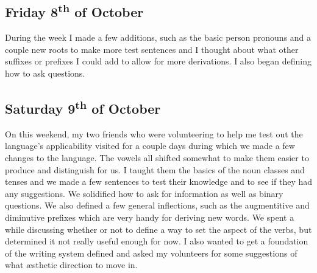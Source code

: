 \documentclass[a4paper,10pt]{article}
\begin{document}
\subsection{Friday 8\textsuperscript{th} of October}
During the week I made a few additions, such as the basic person pronouns and a couple new
roots to make more test sentences and I thought about what other suffixes or prefixes I
could add to allow for more derivations. I also began defining how to ask questions.

\subsection{Saturday 9\textsuperscript{th} of October}
On this weekend, my two friends who were volunteering to help me test out the language's
applicability visited for a couple days during which we made a few changes to the language.
The vowels all shifted somewhat to make them easier to produce and distinguish for us. I
taught them the basics of the noun classes and tenses and we made a few sentences to test
their knowledge and to see if they had any suggestions. We solidified how to ask for
information as well as binary questions. We also defined a few general inflections, such
as the augmentitive and diminutive prefixes which are very handy for deriving new words.
We spent a while discussing whether or not to define a way to set the aspect of the verbs,
but determined it not really useful enough for now. I also wanted to get a foundation of
the writing system defined and asked my volunteers for some suggestions of what \ae sthetic
direction to move in.
\end{document}
